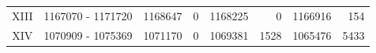 \begin{table}[ht!]
\begin{center}
\begin{tabular}{c | c  r  r  r  r r r}
XIII & \num[group-separator={\,}]{1167070} - \num[group-separator={\,}]{1171720} & \num[group-separator={\,}]{1168647} & \small{\num[group-separator={\,}]{0}}  & \num[group-separator={\,}]{1168225} & \small{\num[group-separator={\,}]{0}}  & \num[group-separator={\,}]{1166916} & \small{\num[group-separator={\,}]{154}}  \\
XIV & \num[group-separator={\,}]{1070909} - \num[group-separator={\,}]{1075369} & \num[group-separator={\,}]{1071170} & \small{\num[group-separator={\,}]{0}}  & \num[group-separator={\,}]{1069381} & \small{\num[group-separator={\,}]{1528}}  & \num[group-separator={\,}]{1065476} & \small{\num[group-separator={\,}]{5433}}  \\
\end{tabular}
\end{center}
\label{supptable:trophs_results}
\end{table}

\clearpage

